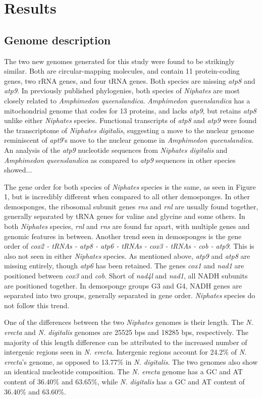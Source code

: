 \documentclass[../main.tex]{subfiles}
\begin{document}
\section{Results}

\subsection{Genome description}
The two new genomes generated for this study were found to be strikingly similar. Both are circular-mapping molecules, and contain 11 protein-coding genes, two rRNA genes, and four tRNA genes. Both species are missing \emph{atp8} and \emph{atp9}. In previously published phylogenies, both species of \emph{Niphates} are most closely related to \emph{Amphimedon queenslandica}. \emph{Amphimedon queenslandica} has a mitochondrial genome that codes for 13 proteins, and lacks \emph{atp9}, but retains \emph{atp8} unlike either \emph{Niphates} species. Functional transcripts of \emph{atp8} and \emph{atp9} were found the transcriptome of \emph{Niphates digitalis}, suggesting a move to the nuclear genome reminiscent of \emph{apt9}'s move to the nuclear genome in \emph{Amphimedon queenslandica}. An analysis of the \emph{atp9} nucleotide sequences from \emph{Niphates digitalis} and \emph{Amphimedon queenslandica} as compared to \emph{atp9} sequences in other species showed...

The gene order for both species of \emph{Niphates} species is the same, as seen in Figure 1, but is incredibly different when compared to all other demosponges. In other demosponges, the ribosomal subunit genes \emph{rns} and \emph{rnl} are usually found together, generally separated by tRNA genes for valine and glycine and some others. In both \emph{Niphates} species, \emph{rnl} and \emph{rns} are found far apart, with multiple genes and genomic features in between. Another trend seen in demosponges is the gene order of \emph{cox2 - tRNAs - atp8 - atp6 - tRNAs - cox3 - tRNAs - cob - atp9}. This is also not seen in either \emph{Niphates} species. As mentioned above, \emph{atp9} and \emph{atp8} are missing entirely, though \emph{atp6} has been retained. The genes \emph{cox1} and \emph{nad1} are positioned between \emph{cox3} and \emph{cob}. Short of \emph{nad4l} and \emph{nad1}, all NADH subunits are positioned together. In demosponge groups G3 and G4, NADH genes are separated into two groups, generally separated in gene order. \emph{Niphates} species do not follow this trend. 

One of the differences between the two \emph{Niphates} genomes is their length. The \emph{N. erecta} and \emph{N. digitalis} genomes are 25525 bps and 18285 bps, respectively. The majority of this length difference can be attributed to the increased number of intergenic regions seen in \emph{N. erecta}. Intergenic regions account for 24.2\% of \emph{N. erecta}'s genome, as opposed to 13.77\% in \emph{N. digitalis}. The two genomes also show an identical nucleotide composition. The \emph{N. erecta} genome has a GC and AT content of 36.40\% and 63.65\%, while \emph{N. digitalis} has a GC and AT content of 36.40\% and 63.60\%. 
\end{document}
